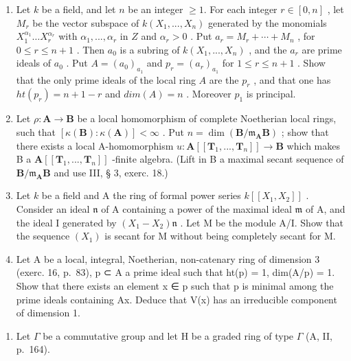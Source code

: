 \begin{enumerate}
\def\labelenumi{\arabic{enumi})}
\setcounter{enumi}{3}
\item
  Let \(k\) be a field, and let \(n\) be an integer \(\geqslant 1\). For each integer \(r \in [0, n]\) , let \(M_r\) be the vector subspace of \(k(X_1, ..., X_n)\) generated by the monomials \(X_1^{\alpha_1}\ldots X_r^{\alpha_r}\) with \(\alpha_1, ..., \alpha_r\) in \(Z\) and \(\alpha_r > 0\) . Put \(a_r = M_r + \cdots + M_n\) , for \(0 \leqslant r \leqslant n + 1\) . Then \(a_0\) is a subring of \(k(X_1, ..., X_n)\) , and the \(a_r\) are prime ideals of \(a_0\) . Put \(A = (a_0)_{a_1}\) and \(p_r = (a_r)_{a_1}\) for \(1 \leqslant r \leqslant n + 1\) . Show that the only prime ideals of the local ring \(A\) are the \(p_r\) , and that one has \(ht(p_r) = n + 1 - r\) and \(dim(A) = n\) . Moreover \(p_1\) is principal.
\item
  Let \(\rho: \mathbf{A} \to \mathbf{B}\) be a local homomorphism of complete Noetherian local rings, such that \([\kappa(\mathbf{B}): \kappa(\mathbf{A})] < \infty\) . Put \(n = \dim(\mathbf{B}/\mathfrak{m}_{\mathbf{A}}\mathbf{B})\) ; show that there exists a local A-homomorphism \(u: \mathbf{A}[[\mathbf{T}_1, ..., \mathbf{T}_n]] \to \mathbf{B}\) which makes B a \(\mathbf{A}[[\mathbf{T}_1, ..., \mathbf{T}_n]]\) -finite algebra. (Lift in B a maximal secant sequence of \(\mathbf{B}/\mathfrak{m}_{\mathbf{A}}\mathbf{B}\) and use III, § 3, exerc. 18.)
\item
  Let \(k\) be a field and A the ring of formal power series \(k[[X_1, X_2]]\) . Consider an ideal \(\mathfrak{n}\) of A containing a power of the maximal ideal \(\mathfrak{m}\) of A, and the ideal I generated by \((X_1 - X_2)\mathfrak{n}\) . Let M be the module A/I. Show that the sequence \((X_1)\) is secant for M without being completely secant for M.
\item
  Let A be a local, integral, Noetherian, non-catenary ring of dimension 3 (exerc. 16, p.~83), p ⊂ A a prime ideal such that ht(p) = 1, dim(A/p) = 1. Show that there exists an element x ∈ p such that p is minimal among the prime ideals containing Ax. Deduce that V(x) has an irreducible component of dimension 1.
\end{enumerate}


\begin{enumerate}
\def\labelenumi{\arabic{enumi})}
\tightlist
\item
  Let \(\Gamma\) be a commutative group and let H be a graded ring of type \(\Gamma\) (A, II, p.~164).
\end{enumerate}

